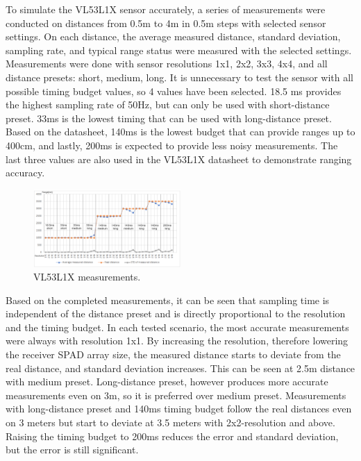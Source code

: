 \documentclass[conference]{IEEEtran}
\begin{document}
To simulate the VL53L1X sensor accurately, a series of measurements were conducted on distances from 0.5m to 4m
in 0.5m steps with selected sensor settings. On each distance, the average measured distance, standard deviation,
sampling rate, and typical range status were measured with the selected settings. Measurements were done with 
sensor resolutions 1x1, 2x2, 3x3, 4x4, and all distance presets: short, medium, long. It is unnecessary to test
the sensor with all possible timing budget values, so 4 values have been selected.
18.5 ms provides the highest sampling rate of 50Hz, but can only be used with short-distance preset. 33ms is the 
lowest timing that can be used with long-distance preset. Based on the datasheet, 140ms is the lowest budget that
can provide ranges up to 400cm, and lastly, 200ms is expected to provide less noisy measurements.
The last three values are also used in the VL53L1X datasheet\cite{VL53L1XDatasheet} to demonstrate ranging 
accuracy. 
\begin{figure}[!t]
\centering
\includegraphics[width=0.5\textwidth]{vl53l1x_measurements_opmodes.png}
\caption{VL53L1X measurements.}
\label{fig_sim}
\end{figure}

Based on the completed measurements, it can be seen that sampling time is independent of the distance preset 
and is directly proportional to the resolution and the timing budget. In each tested 
scenario, the most accurate measurements were always with resolution 1x1. By increasing the resolution, therefore
lowering the receiver SPAD array size, the measured distance starts to deviate from the real distance, and 
standard deviation increases. This can be seen at 2.5m distance with medium preset. Long-distance preset, 
however produces more accurate measurements even on 3m, so it is preferred over medium preset. Measurements 
with long-distance preset and 140ms timing budget follow the real distances even on 3 meters but start to 
deviate at 3.5 meters with 2x2-resolution and above. Raising the timing budget to 200ms reduces the error 
and standard deviation, but the error is still significant.
\end{document}
